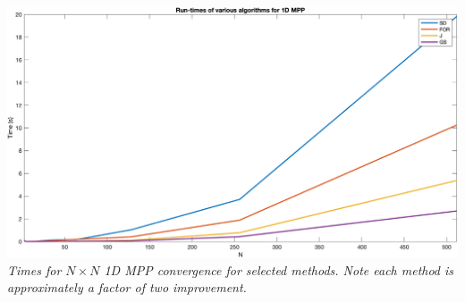 \documentclass[12pt,letterpaper]{article}
\theoremstyle{definition}
\begin{document}
\begin{center}
\includegraphics[width=15cm]{1Dtimes.png}\\
\it Times for $N\times N$ 1D MPP convergence for selected methods. Note each method is approximately a factor of two improvement.
\end{center}
\end{document}
